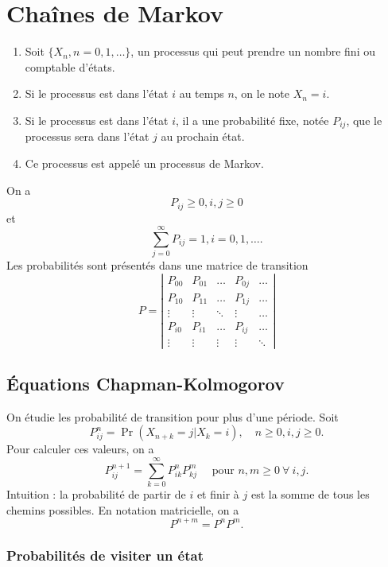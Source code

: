 \chapter{Chaînes de Markov}

\begin{enumerate}
	\item Soit $\{X_n, n = 0, 1, \dots\}$, un processus qui peut prendre un nombre fini ou comptable d'états. 
	\item Si le processus est dans l'état $i$ au temps $n$, on le note $X_n = i$. 
	\item Si le processus est dans l'état $i$, il a une probabilité fixe, notée $P_{ij}$, que le processus sera dans l'état $j$ au prochain état. 
	\item Ce processus est appelé un processus de Markov. 
\end{enumerate}

On a $$P_{ij} \geq 0, i, j \geq 0$$
et
$$\sum_{j =0 }^{\infty} P_{ij} = 1, i = 0, 1, \dots .$$
Les probabilités sont présentés dans une matrice de transition
$$P = \left|\begin{array}{ccccc}
	P_{00} & P_{01} & \dots & P_{0j} & \dots \\
	P_{10} & P_{11} & \dots & P_{1j} & \dots \\
	\vdots & \vdots & \ddots & \vdots & \dots \\
	P_{i0} & P_{i1} & \dots & P_{ij} & \dots \\
	\vdots & \vdots & \vdots & \vdots & \ddots 
\end{array}\right|$$

\section{Équations Chapman-Kolmogorov}

On étudie les probabilité de transition pour plus d'une période. Soit 
$$P_{ij}^{n} = \Pr(X_{n+k} = j \vert X_k = i), \quad n\geq 0, i, j \geq 0.$$
Pour calculer ces valeurs, on a 
$$P_{ij}^{n+1} = \sum_{k = 0}^{\infty} P_{ik}^nP_{kj}^m \quad \text{ pour }n, m \geq 0 ~\forall~ i, j.$$
Intuition : la probabilité de partir de $i$ et finir à $j$ est la somme de tous les chemins possibles. En notation matricielle, on a 
$$P^{n+m} = P^n P^m.$$

\subsection{Probabilités de visiter un état}

